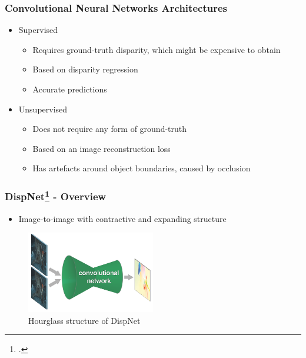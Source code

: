 \documentclass{beamer}
\begin{document}
\begin{frame}
\frametitle{Convolutional Neural Networks Architectures}
\center
\begin{itemize}
	\item Supervised
		\begin{itemize}
			\item Requires ground-truth disparity, which might be expensive to obtain
			\item Based on disparity regression
			\item Accurate predictions
		\end{itemize}
	\item Unsupervised
		\begin{itemize}
			\item Does not require any form of ground-truth
			\item Based on an image reconstruction loss
			\item Has artefacts around object boundaries, caused by occlusion
		\end{itemize}
\end{itemize}
\end{frame}

\begin{frame}
\frametitle{DispNet\footcite{DBLP:journals/corr/MayerIHFCDB15} - Overview}
\center
\begin{itemize}
	\item Image-to-image with contractive and expanding structure
\end{itemize}
\begin{figure}
    \centering
        \includegraphics[width=0.5\textwidth]{hourglass.png}
        \caption{Hourglass structure of DispNet}
    \end{figure}
\end{frame}
\end{document}
